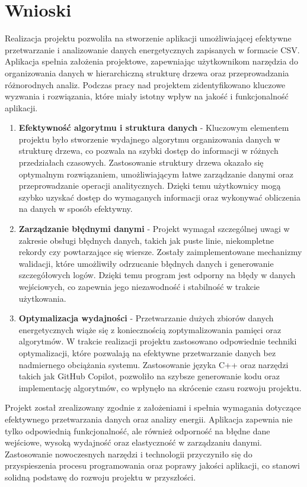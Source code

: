 \newpage
\section{Wnioski}	%
\nocite{www1}
\nocite{www2}
\nocite{www3}
\nocite{www4}
Realizacja projektu pozwoliła na stworzenie aplikacji umożliwiającej efektywne przetwarzanie i analizowanie danych energetycznych zapisanych w formacie CSV. Aplikacja spełnia założenia projektowe, zapewniając użytkownikom narzędzia do organizowania danych w hierarchiczną strukturę drzewa oraz przeprowadzania różnorodnych analiz. Podczas pracy nad projektem zidentyfikowano kluczowe wyzwania i rozwiązania, które miały istotny wpływ na jakość i funkcjonalność aplikacji.
\begin{enumerate}
    \item \textbf{Efektywność algorytmu i struktura danych} - Kluczowym elementem projektu było stworzenie wydajnego algorytmu organizowania danych w strukturę drzewa, co pozwala na szybki dostęp do informacji w różnych przedziałach czasowych. Zastosowanie struktury drzewa okazało się optymalnym rozwiązaniem, umożliwiającym łatwe zarządzanie danymi oraz przeprowadzanie operacji analitycznych. Dzięki temu użytkownicy mogą szybko uzyskać dostęp do wymaganych informacji oraz wykonywać obliczenia na danych w sposób efektywny.
    \item \textbf{Zarządzanie błędnymi danymi} - Projekt wymagał szczególnej uwagi w zakresie obsługi błędnych danych, takich jak puste linie, niekompletne rekordy czy powtarzające się wiersze. Zostały zaimplementowane mechanizmy walidacji, które umożliwiły odrzucanie błędnych danych i generowanie szczegółowych logów. Dzięki temu program jest odporny na błędy w danych wejściowych, co zapewnia jego niezawodność i stabilność w trakcie użytkowania.
    \item \textbf{Optymalizacja wydajności} - Przetwarzanie dużych zbiorów danych energetycznych wiąże się z koniecznością zoptymalizowania pamięci oraz algorytmów. W trakcie realizacji projektu zastosowano odpowiednie techniki optymalizacji, które pozwalają na efektywne przetwarzanie danych bez nadmiernego obciążania systemu. Zastosowanie języka C++ oraz narzędzi takich jak GitHub Copilot, pozwoliło na szybsze generowanie kodu oraz implementację algorytmów, co wpłynęło na skrócenie czasu rozwoju projektu.
\end{enumerate}
Projekt został zrealizowany zgodnie z założeniami i spełnia wymagania dotyczące efektywnego przetwarzania danych oraz analizy energii. Aplikacja zapewnia nie tylko odpowiednią funkcjonalność, ale również odporność na błędne dane wejściowe, wysoką wydajność oraz elastyczność w zarządzaniu danymi. Zastosowanie nowoczesnych narzędzi i technologii przyczyniło się do przyspieszenia procesu programowania oraz poprawy jakości aplikacji, co stanowi solidną podstawę do rozwoju projektu w przyszłości.
